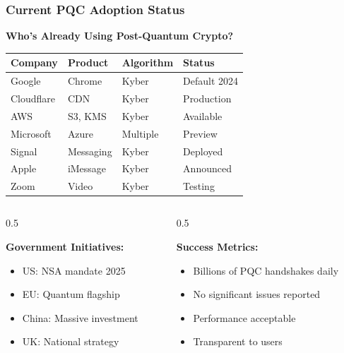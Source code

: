 \documentclass[aspectratio=169,10pt]{beamer}
\newcommand{\slideheader}[1]{\frametitle{#1}}
\theoremstyle{plain}
\begin{document}
\begin{frame}
  \slideheader{Current PQC Adoption Status}
  
  \begin{center}
    \textbf{\large Who's Already Using Post-Quantum Crypto?}
  \end{center}
  
  \vspace{0.5cm}
  
  \begin{table}
    \centering
    \small
    \begin{tabular}{|l|l|l|l|}
      \hline
      \textbf{Company} & \textbf{Product} & \textbf{Algorithm} & \textbf{Status} \\
      \hline
      Google & Chrome & Kyber & Default 2024 \\
      Cloudflare & CDN & Kyber & Production \\
      AWS & S3, KMS & Kyber & Available \\
      Microsoft & Azure & Multiple & Preview \\
      Signal & Messaging & Kyber & Deployed \\
      Apple & iMessage & Kyber & Announced \\
      Zoom & Video & Kyber & Testing \\
      \hline
    \end{tabular}
  \end{table}
  
  \vspace{0.5cm}
  
  \begin{columns}[T]
    \begin{column}{0.5\textwidth}

    \textbf{Government Initiatives:}
    \begin{itemize}
      \item US: NSA mandate 2025
      \item EU: Quantum flagship
      \item China: Massive investment
      \item UK: National strategy
    \end{itemize}
  
    \end{column}
    \begin{column}{0.5\textwidth}

    \textbf{Success Metrics:}
    \begin{itemize}
      \item Billions of PQC handshakes daily
      \item No significant issues reported
      \item Performance acceptable
      \item Transparent to users
    \end{itemize}
  

\end{column}
\end{columns}
\end{frame}
\end{document}
